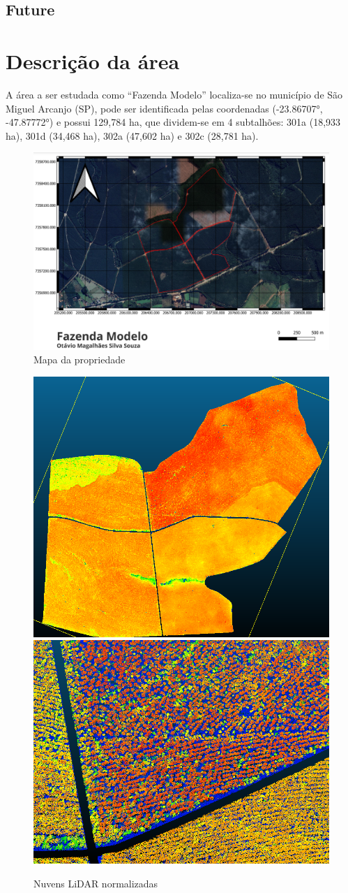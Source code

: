 \documentclass[
]{article}
\begin{document}
\subsection{Future}\label{future}

\newpage

\section{Descrição da área}\label{descriuxe7uxe3o-da-uxe1rea}

A área a ser estudada como ``Fazenda Modelo'' localiza-se no município
de São Miguel Arcanjo (SP), pode ser identificada pelas coordenadas
(-23.86707°, -47.87772°) e possui 129,784 ha, que dividem-se em 4
subtalhões: 301a (18,933 ha), 301d (34,468 ha), 302a (47,602 ha) e 302c
(28,781 ha).

\begin{figure}

{\centering \includegraphics[width=0.6\linewidth]{IMAGES/mapafazendamodelo} 

}

\caption{Mapa da propriedade}\label{fig:unnamed-chunk-3}
\end{figure}
\begin{figure}

{\centering \includegraphics[width=0.4\linewidth]{IMAGES/nuvensnormalizadas} \includegraphics[width=0.4\linewidth]{IMAGES/nuvensnormalizadaszoom} 

}

\caption{Nuvens LiDAR normalizadas}\label{fig:unnamed-chunk-4}
\end{figure}
\end{document}
